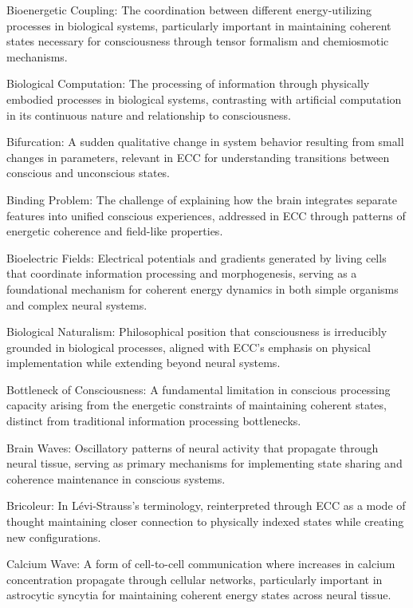 Bioenergetic Coupling: The coordination between different energy-utilizing processes in biological systems, particularly important in maintaining coherent states necessary for consciousness through tensor formalism and chemiosmotic mechanisms.

Biological Computation: The processing of information through physically embodied processes in biological systems, contrasting with artificial computation in its continuous nature and relationship to consciousness.

Bifurcation: A sudden qualitative change in system behavior resulting from small changes in parameters, relevant in ECC for understanding transitions between conscious and unconscious states.

Binding Problem: The challenge of explaining how the brain integrates separate features into unified conscious experiences, addressed in ECC through patterns of energetic coherence and field-like properties.

Bioelectric Fields: Electrical potentials and gradients generated by living cells that coordinate information processing and morphogenesis, serving as a foundational mechanism for coherent energy dynamics in both simple organisms and complex neural systems.

Biological Naturalism: Philosophical position that consciousness is irreducibly grounded in biological processes, aligned with ECC's emphasis on physical implementation while extending beyond neural systems.

Bottleneck of Consciousness: A fundamental limitation in conscious processing capacity arising from the energetic constraints of maintaining coherent states, distinct from traditional information processing bottlenecks.

Brain Waves: Oscillatory patterns of neural activity that propagate through neural tissue, serving as primary mechanisms for implementing state sharing and coherence maintenance in conscious systems.

Bricoleur: In Lévi-Strauss's terminology, reinterpreted through ECC as a mode of thought maintaining closer connection to physically indexed states while creating new configurations.

Calcium Wave: A form of cell-to-cell communication where increases in calcium concentration propagate through cellular networks, particularly important in astrocytic syncytia for maintaining coherent energy states across neural tissue.

